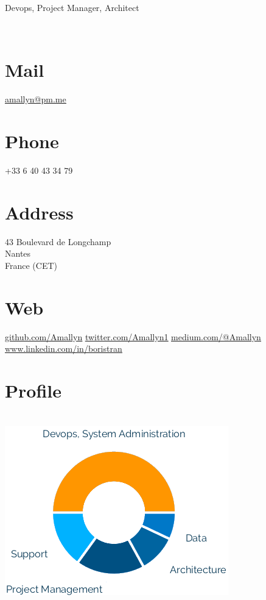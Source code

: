 \documentclass[]{cv-class}
\begin{document}
\vspace{0.2cm}
      {Devops, Project Manager, Architect}

\vspace{1.15cm}

\begin{aside}
  \vspace{0.4cm}
    ~		
  \vspace{0.65cm}
  \section{Mail}
    \underline{\href{mailto:amallyn@pm.me}{amallyn@pm.me}}
    ~
  \section{Phone}
    +33 6 40 43 34 79
    ~
  \section{Address}
    43 Boulevard de Longchamp\\
    Nantes\\
    France (CET)
    ~
  \section{Web}
	\vspace{0.10cm}
    \underline{\href{https://github.com/Amallyn}{github.com/Amallyn}}
	\vspace{0.10cm}
    \underline{\href{https://twitter.com/Amallyn1}{twitter.com/Amallyn1}}
	\vspace{0.10cm}
    \underline{\href{https://medium.com/@Amallyn}{medium.com/@Amallyn}}
	\vspace{0.10cm}
    \underline{\href{https://www.linkedin.com/in/boristran}{www.linkedin.com/in/boristran}}
    ~
  \section{Profile}
    \\
    \includegraphics[scale=0.8]{img/skills.png}
    ~

\end{aside}
\end{document}

